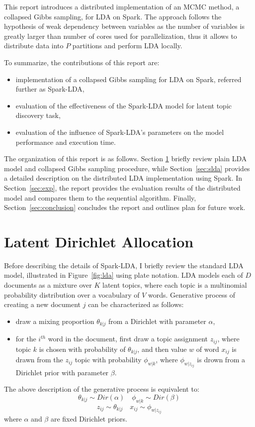 \documentclass[journal]{IEEEtran}
\begin{document}
This report introduces a distributed implementation of an MCMC method, a collapsed Gibbs sampling, for LDA on Spark. The approach follows the hypothesis of weak dependency between variables as the number of variables is greatly larger than number of cores used for parallelization\cite{newman2009distributed}, thus it allows to distribute data into $P$ partitions and perform LDA locally. 

To summarize, the contributions of this report are:
\begin{itemize}
\item implementation of a collapsed Gibbs sampling for LDA on Spark, referred further as Spark-LDA,
\item evaluation of the effectiveness of the Spark-LDA model for latent topic discovery task,
\item evaluation of the influence of Spark-LDA's parameters on the model performance and execution time.
\end{itemize}
The organization of this report is as follows. Section \ref{sec:lda} briefly review plain LDA model and collapsed Gibbs sampling procedure, while Section~\ref{sec:slda} provides a detailed description on the distributed LDA implementation using Spark. In Section~\ref{sec:exp}, the report provides the evaluation results of the distributed model and compares them to the sequential algorithm. Finally, Section~\ref{sec:conclusion} concludes the report and outlines plan for future work.

\section{Latent Dirichlet Allocation}
\label{sec:lda}
Before describing the details of Spark-LDA, I briefly review the standard LDA model, illustrated in Figure~\ref{fig:lda} using plate notation.  LDA models each of $D$ documents as a mixture over $K$ latent topics, where each topic is a multinomial probability distribution over a vocabulary of $V$ words. Generative process of creating a new document $j$ can be characterized as follows:
\begin{itemize}
\item draw a mixing proportion $\theta_{k|j}$ from a Dirichlet with parameter $\alpha$,
\item for the $i^{th}$ word in the document, first draw a topic assignment $z_{ij}$, where topic $k$ is chosen with probability of $\theta_{k|j}$, and then value $w$ of word $x_{ij}$ is drawn from the $z_{ij}$ topic with probability $\phi_{w|k}$, where $\phi_{w|z_{ij}}$ is drown from a Dirichlet prior with parameter $\beta$.
\end{itemize}
The above description of the generative process is equivalent to:
$$
\theta_{k|j}\sim Dir(\alpha) \quad \phi_{w|k}\sim Dir(\beta)
$$
$$z_{ij}\sim \theta_{k|j} \quad  x_{ij}\sim \phi_{w|z_{ij}}
$$
where $\alpha$ and $\beta$ are fixed Dirichlet priors.
\end{document}
